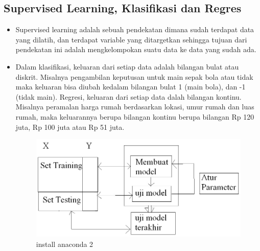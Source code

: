\subsection {Supervised Learning, Klasifikasi dan Regres}
\begin{itemize}
\item Supervised learning adalah sebuah pendekatan dimana sudah terdapat data yang dilatih, dan terdapat variable yang ditargetkan sehingga tujuan dari pendekatan ini adalah mengkelompokan suatu data ke data yang sudah ada.

\item Dalam klasifikasi, keluaran dari setiap data adalah bilangan bulat atau diskrit. Misalnya pengambilan keputusan untuk main sepak bola atau tidak maka keluaran bisa diubah kedalam bilangan bulat 1 (main bola), dan -1 (tidak main). Regresi, keluaran dari setiap data dalah bilangan kontinu. Misalnya peramalan harga rumah berdasarkan lokasi, umur rumah dan luas rumah, maka keluarannya berupa bilangan kontinu berupa bilangan Rp 120 juta, Rp 100 juta atau Rp 51 juta.

\begin{figure}[ht]
\centering
\includegraphics[scale=0.5]{figures/Screenshot_2.jpg}
\caption{install anaconda 2}
\label{contoh}
\end{figure}

\end{itemize}


